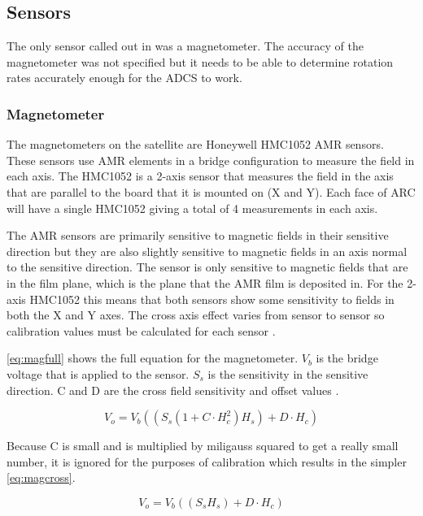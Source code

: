 \subsection{Sensors}

The only sensor called out in \cite{Mentch11} was a magnetometer. The accuracy of the magnetometer was not specified but it needs to be able to determine rotation rates accurately enough for the \ac{ADCS} to work.

\subsubsection{Magnetometer}

The magnetometers on the satellite are Honeywell HMC1052 \ac{AMR} sensors. These sensors use \ac{AMR} elements in a bridge configuration to measure the field in each axis. The HMC1052 is a 2-axis sensor that measures the field in the axis that are parallel to the board that it is mounted on (X and Y). Each face of \ac{ARC} will have a single HMC1052 giving a total of 4 measurements in each axis.

The \ac{AMR} sensors are primarily sensitive to magnetic fields in their sensitive direction but they are also slightly sensitive to magnetic fields in an axis normal to the sensitive direction. The sensor is only sensitive to magnetic fields that are in the film plane, which is the plane that the \ac{AMR} film is deposited in. For the 2-axis HMC1052 this means that both sensors show some sensitivity to fields in both the X and Y axes. The cross axis effect varies from sensor to sensor  so calibration values must be calculated for each sensor \cite{AN215}.

\autoref{eq:magfull} shows the full equation for the magnetometer. $V_b$ is the bridge voltage that is applied to the sensor. $S_s$ is the sensitivity in the sensitive direction. C and D are the cross field sensitivity and offset values \cite{AN215}.

\begin{equation}
    V_o = V_b \left( \left( S_s \left( 1 + C \cdot H_c^2 \right) H_s \right) + D \cdot H_c \right)
    \label{eq:magfull}
\end{equation}

Because C is small and is multiplied by miligauss squared to get a really small number, it is ignored for the purposes of calibration which results in the simpler \autoref{eq:magcross}.

\begin{equation}
    V_o = V_b \left( \left( S_s H_s \right) + D \cdot H_c \right)
    \label{eq:magcross}
\end{equation}

